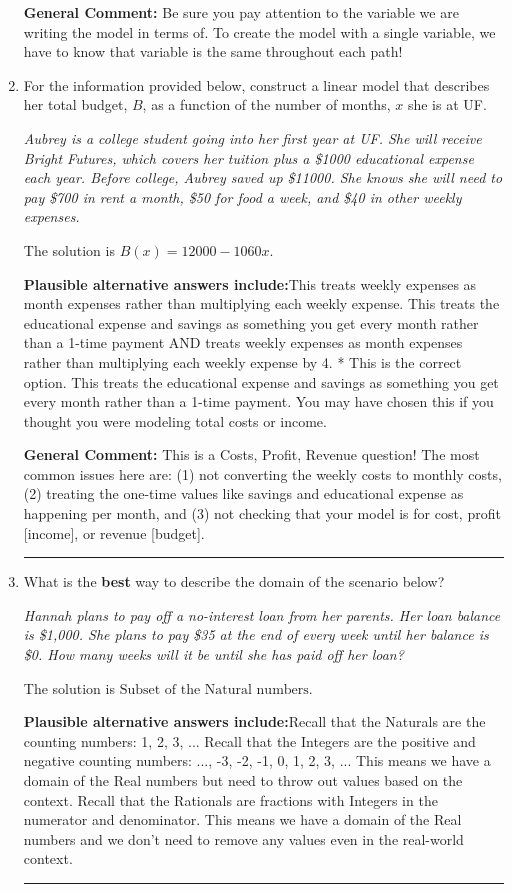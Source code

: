 \documentclass{extbook}[14pt]
\newcommand{\litem}[1]{\item #1

\rule{\textwidth}{0.4pt}}
\begin{document}
\begin{enumerate}
{\textbf{General Comment:} Be sure you pay attention to the variable we are writing the model in terms of. To create the model with a single variable, we have to know that variable is the same throughout each path!
}
\litem{
For the information provided below, construct a linear model that describes her total budget, $B$, as a function of the number of months, $x$ she is at UF.

\begin{center}
    \textit{ Aubrey is a college student going into her first year at UF. She will receive Bright Futures, which covers her tuition plus a \$1000 educational expense each year. Before college, Aubrey saved up \$11000. She knows she will need to pay \$700 in rent a month, \$50 for food a week, and \$40 in other weekly expenses. }
\end{center}
The solution is \( B(x) = 12000 - 1060 x \).\begin{enumerate}[label=\Alph*.]
\textbf{Plausible alternative answers include:}This treats weekly expenses as month expenses rather than multiplying each weekly expense.
This treats the educational expense and savings as something you get every month rather than a 1-time payment AND treats weekly expenses as month expenses rather than multiplying each weekly expense by 4.
* This is the correct option.
This treats the educational expense and savings as something you get every month rather than a 1-time payment.
You may have chosen this if you thought you were modeling total costs or income.
\end{enumerate}

\textbf{General Comment:} This is a Costs, Profit, Revenue question! The most common issues here are: (1) not converting the weekly costs to monthly costs, (2) treating the one-time values like savings and educational expense as happening per month, and (3) not checking that your model is for cost, profit [income], or revenue [budget].
}
\litem{
What is the \textbf{best} way to describe the domain of the scenario below?

\begin{center}
    \textit{ Hannah plans to pay off a no-interest loan from her parents. Her loan balance is \$1,000. She plans to pay \$35 at the end of every week until her balance is \$0. How many weeks will it be until she has paid off her loan? }
\end{center}
The solution is \( \text{Subset of the Natural numbers} \).\begin{enumerate}[label=\Alph*.]
\textbf{Plausible alternative answers include:}Recall that the Naturals are the counting numbers: 1, 2, 3, ...
Recall that the Integers are the positive and negative counting numbers: ..., -3, -2, -1, 0, 1, 2, 3, ... 
This means we have a domain of the Real numbers but need to throw out values based on the context.
Recall that the Rationals are fractions with Integers in the numerator and denominator.
This means we have a domain of the Real numbers and we don't need to remove any values even in the real-world context.
\end{enumerate}

}
\end{enumerate}
\end{document}

